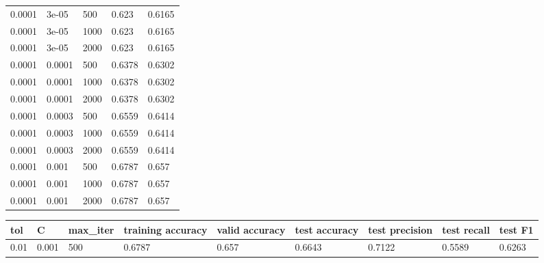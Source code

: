 \documentclass{article}%
\begin{document}
\begin{longtable}{l l l l l}
0.0001&3e{-}05&500&0.623&0.6165\\%
0.0001&3e{-}05&1000&0.623&0.6165\\%
0.0001&3e{-}05&2000&0.623&0.6165\\%
0.0001&0.0001&500&0.6378&0.6302\\%
0.0001&0.0001&1000&0.6378&0.6302\\%
0.0001&0.0001&2000&0.6378&0.6302\\%
0.0001&0.0003&500&0.6559&0.6414\\%
0.0001&0.0003&1000&0.6559&0.6414\\%
0.0001&0.0003&2000&0.6559&0.6414\\%
0.0001&0.001&500&0.6787&0.657\\%
0.0001&0.001&1000&0.6787&0.657\\%
0.0001&0.001&2000&0.6787&0.657\\%
\hline%
\end{longtable}%
\begin{longtable}{l l l l l l l l l}%
\hline%
tol&C&max\_iter&training accuracy&valid accuracy&test accuracy&test precision&test recall&test F1\\%
\hline%
\endhead%
\hline%
0.01&0.001&500&0.6787&0.657&0.6643&0.7122&0.5589&0.6263\\%
\hline%
\end{longtable}%
\end{document}
